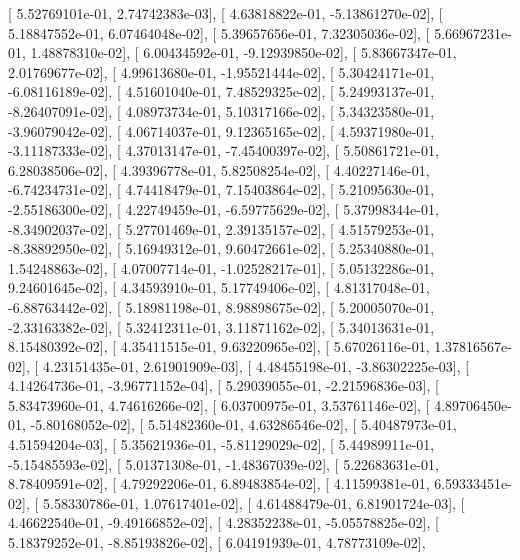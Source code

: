 \documentclass{article}
\begin{document}
       [  5.52769101e-01,   2.74742383e-03],
       [  4.63818822e-01,  -5.13861270e-02],
       [  5.18847552e-01,   6.07464048e-02],
       [  5.39657656e-01,   7.32305036e-02],
       [  5.66967231e-01,   1.48878310e-02],
       [  6.00434592e-01,  -9.12939850e-02],
       [  5.83667347e-01,   2.01769677e-02],
       [  4.99613680e-01,  -1.95521444e-02],
       [  5.30424171e-01,  -6.08116189e-02],
       [  4.51601040e-01,   7.48529325e-02],
       [  5.24993137e-01,  -8.26407091e-02],
       [  4.08973734e-01,   5.10317166e-02],
       [  5.34323580e-01,  -3.96079042e-02],
       [  4.06714037e-01,   9.12365165e-02],
       [  4.59371980e-01,  -3.11187333e-02],
       [  4.37013147e-01,  -7.45400397e-02],
       [  5.50861721e-01,   6.28038506e-02],
       [  4.39396778e-01,   5.82508254e-02],
       [  4.40227146e-01,  -6.74234731e-02],
       [  4.74418479e-01,   7.15403864e-02],
       [  5.21095630e-01,  -2.55186300e-02],
       [  4.22749459e-01,  -6.59775629e-02],
       [  5.37998344e-01,  -8.34902037e-02],
       [  5.27701469e-01,   2.39135157e-02],
       [  4.51579253e-01,  -8.38892950e-02],
       [  5.16949312e-01,   9.60472661e-02],
       [  5.25340880e-01,   1.54248863e-02],
       [  4.07007714e-01,  -1.02528217e-01],
       [  5.05132286e-01,   9.24601645e-02],
       [  4.34593910e-01,   5.17749406e-02],
       [  4.81317048e-01,  -6.88763442e-02],
       [  5.18981198e-01,   8.98898675e-02],
       [  5.20005070e-01,  -2.33163382e-02],
       [  5.32412311e-01,   3.11871162e-02],
       [  5.34013631e-01,   8.15480392e-02],
       [  4.35411515e-01,   9.63220965e-02],
       [  5.67026116e-01,   1.37816567e-02],
       [  4.23151435e-01,   2.61901909e-03],
       [  4.48455198e-01,  -3.86302225e-03],
       [  4.14264736e-01,  -3.96771152e-04],
       [  5.29039055e-01,  -2.21596836e-03],
       [  5.83473960e-01,   4.74616266e-02],
       [  6.03700975e-01,   3.53761146e-02],
       [  4.89706450e-01,  -5.80168052e-02],
       [  5.51482360e-01,   4.63286546e-02],
       [  5.40487973e-01,   4.51594204e-03],
       [  5.35621936e-01,  -5.81129029e-02],
       [  5.44989911e-01,  -5.15485593e-02],
       [  5.01371308e-01,  -1.48367039e-02],
       [  5.22683631e-01,   8.78409591e-02],
       [  4.79292206e-01,   6.89483854e-02],
       [  4.11599381e-01,   6.59333451e-02],
       [  5.58330786e-01,   1.07617401e-02],
       [  4.61488479e-01,   6.81901724e-03],
       [  4.46622540e-01,  -9.49166852e-02],
       [  4.28352238e-01,  -5.05578825e-02],
       [  5.18379252e-01,  -8.85193826e-02],
       [  6.04191939e-01,   4.78773109e-02],
\end{document}
